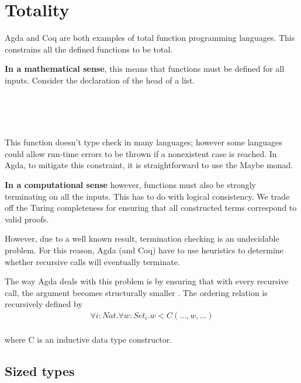 \documentclass[12pt,twoside,notitlepage]{report}
\begin{document}
\section{Totality}

Agda and Coq are both examples of total function programming languages. This constrains all the defined functions to be total. 

\textbf{In a mathematical sense}, this means that functions must be defined for all inputs. Consider the declaration of the head of a list.

\begin{code}
\\
\> \AgdaSymbol{:}  \AgdaSymbol{\{}\AgdaSymbol{\}}     \<%
\\
\> \AgdaSymbol{(}  \AgdaSymbol{)} \AgdaSymbol{=} \<%
\\
\end{code}

This function doesn't type check in many languages; however some languages could allow run-time errors to be thrown if a nonexistent case is reached. In Agda, to mitigate this constraint, it is straightforward to use the Maybe monad.

\textbf{In a computational sense} however, functions must also be strongly terminating on all the inputs. This has to do with logical consistency. We trade off the Turing completeness for ensuring that all constructed terms correspond to valid proofs.

However, due to a well known result, termination checking is an undecidable problem. For this reason, Agda (and Coq) have to use heuristics to determine whether recursive calls will eventually terminate.

The way Agda deals with this problem is by ensuring that with every recursive call, the argument becomes structurally smaller \cite{foetus}. The ordering relation is recursively defined by \begin{align*}
\forall i : Nat.\forall w : Set_i. w < C(...,w,...)
\end{align*}\\
where C is an inductive data type constructor.

\subsection{Sized types}
\end{document}

